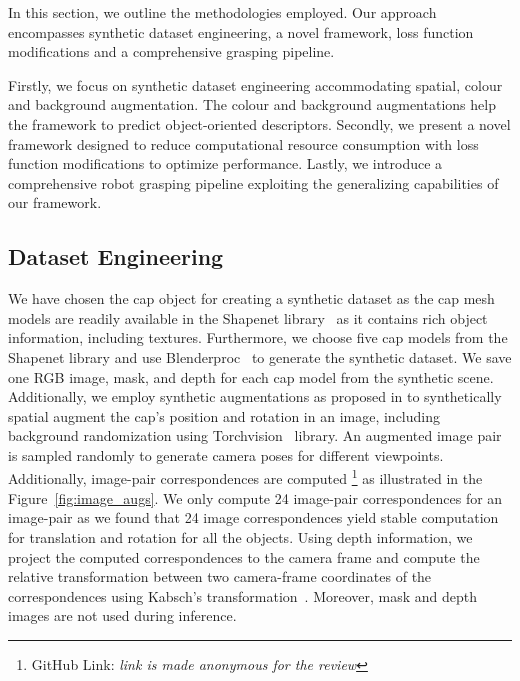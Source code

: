 In this section, we outline the methodologies employed.
Our approach encompasses synthetic dataset engineering,
a novel framework, loss function modifications and a comprehensive grasping pipeline.

Firstly, we focus on synthetic dataset engineering accommodating spatial, colour and background augmentation. The colour and
background augmentations help the framework to predict object-oriented descriptors.
Secondly, we present a novel framework designed to reduce computational resource consumption with loss function
modifications to optimize performance. Lastly, we introduce a comprehensive robot grasping pipeline exploiting the generalizing capabilities of our framework.

\subsection{Dataset Engineering}

We have chosen the cap object for creating a synthetic dataset as the cap mesh models are readily available in the Shapenet library~\cite{chang2015shapenet} as it contains rich object information, including textures.
Furthermore, we choose five cap models from the Shapenet library and use Blenderproc~\cite{blenderproc}
to generate the synthetic dataset. We save one RGB image, mask, and depth for each cap model from the synthetic scene.
Additionally, we employ synthetic augmentations as proposed in \cite{adrian2022efficient} to synthetically
spatial augment the cap's position and rotation in an image, including background randomization
using Torchvision~\cite{marcel2010torchvision} library. An augmented image pair is sampled randomly to generate camera poses for different viewpoints. Additionally, image-pair correspondences are computed
\footnote[1]{GitHub Link: \emph{link is made anonymous for the review}}
as illustrated in the Figure~\ref{fig:image_augs}. We only compute 24 image-pair correspondences
for an image-pair as we found that 24 image correspondences yield stable computation for translation and rotation for all the objects.
Using depth information,
we project the computed correspondences to the camera frame and compute the relative transformation between
two camera-frame coordinates of the correspondences using Kabsch's transformation~\cite{kabsch}.
Moreover, mask and depth images are not used during inference.

